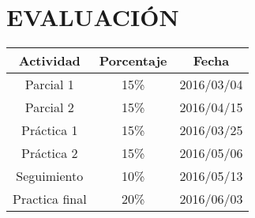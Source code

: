 \section{EVALUACIÓN}

\begin{tabular}{|c|c|c|}
\hline
Actividad 			& Porcentaje	& Fecha \\
\hline
Parcial 1 			& 	15\%	  	&  	2016/03/04 	\\
\hline
Parcial 2 			& 	15\%	  	&  	2016/04/15  \\
\hline
Práctica 1			& 	15\%	  	&  	2016/03/25 	\\
\hline	
Práctica 2 			& 	15\%	  	&  	2016/05/06	\\
\hline	
Seguimiento 		& 	10\%	  	&  	2016/05/13 	\\
\hline
Practica final 		& 	20\%	  	& 	2016/06/03  \\
\hline
\end{tabular}


